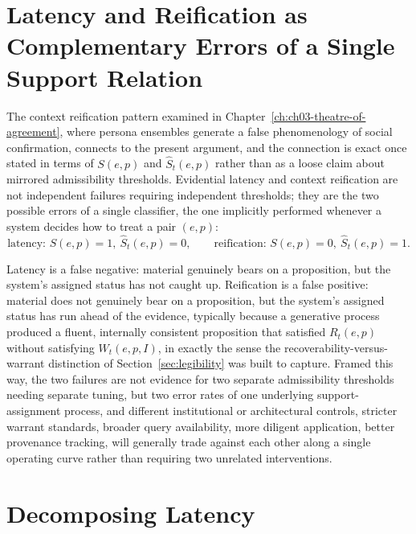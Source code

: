 \section{Latency and Reification as Complementary Errors of a Single Support Relation}

The context reification pattern examined in Chapter~\ref{ch:ch03-theatre-of-agreement}, where persona ensembles generate a false phenomenology of social confirmation, connects to the present argument, and the connection is exact once stated in terms of $S(e,p)$ and $\widehat{S}_t(e,p)$ rather than as a loose claim about mirrored admissibility thresholds. Evidential latency and context reification are not independent failures requiring independent thresholds; they are the two possible errors of a single classifier, the one implicitly performed whenever a system decides how to treat a pair $(e,p)$:
\[
\text{latency: } S(e,p)=1,\ \widehat{S}_t(e,p)=0, \qquad
\text{reification: } S(e,p)=0,\ \widehat{S}_t(e,p)=1.
\]

Latency is a false negative: material genuinely bears on a proposition, but the system's assigned status has not caught up. Reification is a false positive: material does not genuinely bear on a proposition, but the system's assigned status has run ahead of the evidence, typically because a generative process produced a fluent, internally consistent proposition that satisfied $R_t(e,p)$ without satisfying $W_t(e,p,I)$, in exactly the sense the recoverability-versus-warrant distinction of Section~\ref{sec:legibility} was built to capture. Framed this way, the two failures are not evidence for two separate admissibility thresholds needing separate tuning, but two error rates of one underlying support-assignment process, and different institutional or architectural controls, stricter warrant standards, broader query availability, more diligent application, better provenance tracking, will generally trade against each other along a single operating curve rather than requiring two unrelated interventions.

\section{Decomposing Latency}


